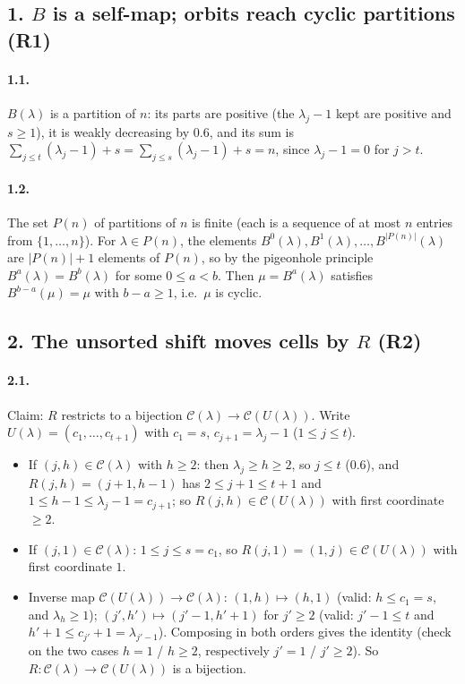 \documentclass[11pt]{article}
\begin{document}
\subsection*{1. $B$ is a self-map; orbits reach cyclic partitions (R1)}

\paragraph{1.1.} $B(\lambda)$ is a partition of $n$: its parts are positive (the $\lambda_j-1$ kept are positive
and $s\ge1$), it is weakly decreasing by 0.6, and its sum is
$\sum_{j\le t}(\lambda_j-1)+s=\sum_{j\le s}(\lambda_j-1)+s=n$, since $\lambda_j-1=0$ for $j>t$.

\paragraph{1.2.} The set $P(n)$ of partitions of $n$ is finite (each is a sequence of at most $n$ entries from
$\{1,\ldots,n\}$). For $\lambda\in P(n)$, the elements $B^0(\lambda),B^1(\lambda),\ldots,B^{|P(n)|}(\lambda)$ are
$|P(n)|+1$ elements of $P(n)$, so by the pigeonhole principle $B^a(\lambda)=B^b(\lambda)$ for some $0\le a<b$.
Then $\mu=B^a(\lambda)$ satisfies $B^{b-a}(\mu)=\mu$ with $b-a\ge1$, i.e.\ $\mu$ is cyclic.

\subsection*{2. The unsorted shift moves cells by $R$ (R2)}

\paragraph{2.1.} Claim: $R$ restricts to a bijection $\mathcal C(\lambda)\to\mathcal C(U(\lambda))$. Write
$U(\lambda)=(c_1,\ldots,c_{t+1})$ with $c_1=s$, $c_{j+1}=\lambda_j-1$ ($1\le j\le t$).
\begin{itemize}
\item If $(j,h)\in\mathcal C(\lambda)$ with $h\ge2$: then $\lambda_j\ge h\ge2$, so $j\le t$ (0.6), and
$R(j,h)=(j+1,h-1)$ has $2\le j+1\le t+1$ and $1\le h-1\le\lambda_j-1=c_{j+1}$; so
$R(j,h)\in\mathcal C(U(\lambda))$ with first coordinate $\ge2$.
\item If $(j,1)\in\mathcal C(\lambda)$: $1\le j\le s=c_1$, so $R(j,1)=(1,j)\in\mathcal C(U(\lambda))$ with first
coordinate $1$.
\item Inverse map $\mathcal C(U(\lambda))\to\mathcal C(\lambda)$: $(1,h)\mapsto(h,1)$ (valid: $h\le c_1=s$, and
$\lambda_h\ge1$); $(j',h')\mapsto(j'-1,h'+1)$ for $j'\ge2$ (valid: $j'-1\le t$ and
$h'+1\le c_{j'}+1=\lambda_{j'-1}$). Composing in both orders gives the identity (check on the two cases $h=1$ /
$h\ge2$, respectively $j'=1$ / $j'\ge2$). So $R:\mathcal C(\lambda)\to\mathcal C(U(\lambda))$ is a bijection.
\end{itemize}
\end{document}
